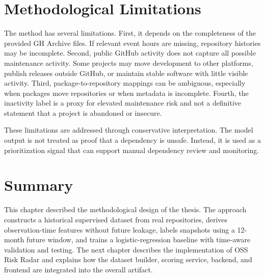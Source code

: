 \section{Methodological Limitations}
\label{sec:method-limitations}

The method has several limitations. First, it depends on the completeness of the provided GH Archive files. If relevant event hours are missing, repository histories may be incomplete. Second, public GitHub activity does not capture all possible maintenance activity. Some projects may move development to other platforms, publish releases outside GitHub, or maintain stable software with little visible activity. Third, package-to-repository mappings can be ambiguous, especially when packages move repositories or when metadata is incomplete. Fourth, the inactivity label is a proxy for elevated maintenance risk and not a definitive statement that a project is abandoned or insecure.

These limitations are addressed through conservative interpretation. The model output is not treated as proof that a dependency is unsafe. Instead, it is used as a prioritization signal that can support manual dependency review and monitoring.

\section{Summary}
\label{sec:method-summary}

This chapter described the methodological design of the thesis. The approach constructs a historical supervised dataset from real repositories, derives observation-time features without future leakage, labels snapshots using a 12-month future window, and trains a logistic-regression baseline with time-aware validation and testing. The next chapter describes the implementation of OSS Risk Radar and explains how the dataset builder, scoring service, backend, and frontend are integrated into the overall artifact.
